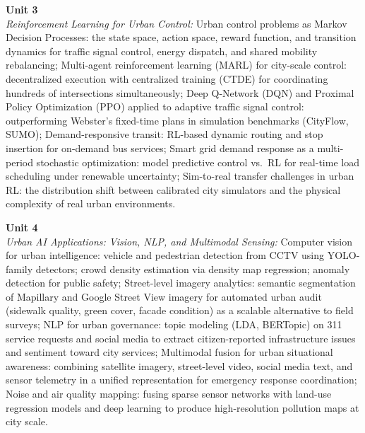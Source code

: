 \vspace{0.3cm}

\noindent\textbf{Unit 3} \\
\textit{Reinforcement Learning for Urban Control:} Urban control problems as Markov Decision Processes: the state space, action space, reward function, and transition dynamics for traffic signal control, energy dispatch, and shared mobility rebalancing; Multi-agent reinforcement learning (MARL) for city-scale control: decentralized execution with centralized training (CTDE) for coordinating hundreds of intersections simultaneously; Deep Q-Network (DQN) and Proximal Policy Optimization (PPO) applied to adaptive traffic signal control: outperforming Webster's fixed-time plans in simulation benchmarks (CityFlow, SUMO); Demand-responsive transit: RL-based dynamic routing and stop insertion for on-demand bus services; Smart grid demand response as a multi-period stochastic optimization: model predictive control vs.\ RL for real-time load scheduling under renewable uncertainty; Sim-to-real transfer challenges in urban RL: the distribution shift between calibrated city simulators and the physical complexity of real urban environments.

\vspace{0.3cm}

\noindent\textbf{Unit 4} \\
\textit{Urban AI Applications: Vision, NLP, and Multimodal Sensing:} Computer vision for urban intelligence: vehicle and pedestrian detection from CCTV using YOLO-family detectors; crowd density estimation via density map regression; anomaly detection for public safety; Street-level imagery analytics: semantic segmentation of Mapillary and Google Street View imagery for automated urban audit (sidewalk quality, green cover, facade condition) as a scalable alternative to field surveys; NLP for urban governance: topic modeling (LDA, BERTopic) on 311 service requests and social media to extract citizen-reported infrastructure issues and sentiment toward city services; Multimodal fusion for urban situational awareness: combining satellite imagery, street-level video, social media text, and sensor telemetry in a unified representation for emergency response coordination; Noise and air quality mapping: fusing sparse sensor networks with land-use regression models and deep learning to produce high-resolution pollution maps at city scale.

\vspace{0.3cm}


